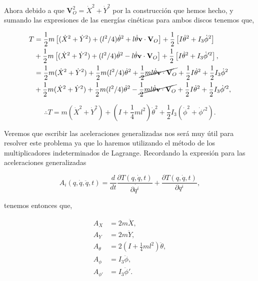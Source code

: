 \documentclass[a4paper,10pt]{article}
\numberwithin{equation}{section}
\begin{document}
Ahora debido a que $\mathbf{V}_O^2 = \dot{X}^2 + \dot{Y}^2$ por la 
construcción que hemos hecho, y sumando las expresiones de las energías 
cinéticas para ambos discos tenemos que,

\begin{align*}
 T &= \frac{1}{2}m\left[(\dot{X}^2 + \dot{Y}^2) + (l^2/4)\dot{\theta}^2 +
 l\dot{\theta}\mathbf{v}\cdot\mathbf{V}_O \right]
 + \frac{1}{2}\left[ I\dot{\theta}^2 + I_3\dot{\phi}^2\right] \\
 &+ \frac{1}{2}m\left[(\dot{X}^2 + \dot{Y}^2) + (l^2/4)\dot{\theta}^2 
 - l\dot{\theta}\mathbf{v}\cdot\mathbf{V}_O \right]
 + \frac{1}{2}\left[ I\dot{\theta}^2 + I_3\dot{\phi}'^2\right], \\
   &= \frac{1}{2}m(\dot{X}^2 + \dot{Y}^2) + \frac{1}{2}m(l^2/4)\dot{\theta}^2 +
      \cancel{\frac{1}{2}ml\dot{\theta}\mathbf{v}\cdot\mathbf{V}_O}
      + \frac{1}{2}I\dot{\theta}^2 + \frac{1}{2}I_3\dot{\phi}^2 \\
  &+ \frac{1}{2}m(\dot{X}^2 + \dot{Y}^2) + \frac{1}{2}m(l^2/4)\dot{\theta}^2 -
      \cancel{\frac{1}{2}ml\dot{\theta}\mathbf{v}\cdot\mathbf{V}_O}
      + \frac{1}{2}I\dot{\theta}^2 + \frac{1}{2}I_3\dot{\phi}'^2,
\end{align*}

\begin{equation}
 \therefore T = m\left(\dot{X}^2 + \dot{Y}^2\right)  
 +\left( I + \frac{1}{4}ml^2 \right) \dot{\theta}^2 
 + \frac{1}{2}I_3 \left(\dot{\phi}^2 + \dot{\phi}'^2\right).
\end{equation}

Veremos que escribir las aceleraciones generalizadas nos será muy útil
para resolver este problema ya que lo haremos utilizando el método de 
los multiplicadores indeterminados de Lagrange. Recordando la expresión
para las aceleraciones generalizadas 

\begin{equation}
 A_i(q,\dot{q},\ddot{q},t) = \frac{d}{dt}\frac{\partial T(q,\dot{q},t)}{\partial\dot{q^i}}
 + \frac{\partial T(q,\dot{q},t)}{\partial q^i},
\end{equation}

tenemos entonces que,

\begin{align}
 A_X &= 2m\ddot{X}, \\
 A_Y &= 2m\ddot{Y}, \\
 A_\theta &= 2 \left( I + \frac{1}{4}ml^2 \right) \ddot{\theta}, \\
 A_\phi &= I_3\ddot{\phi}, \\
 A_{\phi'} &= I_3\ddot{\phi}'.
\end{align}
\end{document}
